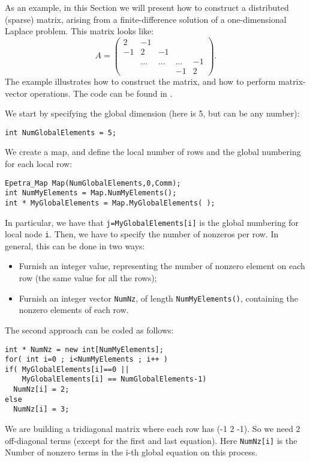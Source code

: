 As an example, in this Section we will present how to construct a
distributed (sparse) matrix, arising from a finite-difference solution
of a one-dimensional Laplace problem. This matrix looks like:
\begin{equation*}
A = \begin{pmatrix}
 2 & -1 &     &   &    \\
-1 &  2     & -1     &        &    \\
   & \ldots & \ldots & \ldots & -1 \\
   &        &        & -1     & 2
\end{pmatrix}.
\end{equation*}
The example illustrates how to construct the matrix,
and how to perform matrix-vector operations.
The code can be found in .

We start by specifying the global dimension (here is 5, but can be any
number):
\begin{verbatim}
int NumGlobalElements = 5;
\end{verbatim}
We create a map, and define the local number of rows and the
global numbering for each local row:
\begin{verbatim}
Epetra_Map Map(NumGlobalElements,0,Comm);
int NumMyElements = Map.NumMyElements();
int * MyGlobalElements = Map.MyGlobalElements( );
\end{verbatim}
In particular, we have that \verb!j=MyGlobalElements[i]! is the global
numbering for local node \verb!i!.  Then, we have to specify the number
of nonzeros per row. In general, this can be done in two ways:
\begin{itemize}
\item Furnish an integer value, representing the number of nonzero
  element on each row (the same value for all the rows);
\item Furnish an integer vector \verb!NumNz!, of length
  \verb!NumMyElements()!, containing the nonzero elements of each row.
\end{itemize}

The second approach can be coded as follows:
\begin{verbatim}
int * NumNz = new int[NumMyElements];
for( int i=0 ; i<NumMyElements ; i++ )
if( MyGlobalElements[i]==0 || 
    MyGlobalElements[i] == NumGlobalElements-1)
  NumNz[i] = 2;
else
  NumNz[i] = 3;
\end{verbatim}
We are building a tridiagonal matrix where each row has (-1 2 -1). So we
need 2 off-diagonal terms (except for the first and last equation). Here
\verb!NumNz[i]! is the Number of nonzero terms in the i-th global
equation on this process.

